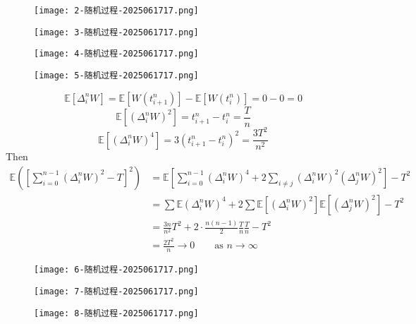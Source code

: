 \begin{figure}[H]
\centering
\texttt{[image: 2-随机过程-2025061717.png]}
\label{}
\end{figure}

\begin{figure}[H]
\centering
\texttt{[image: 3-随机过程-2025061717.png]}
\label{}
\end{figure}
\begin{figure}[H]
\centering
\texttt{[image: 4-随机过程-2025061717.png]}
\label{}
\end{figure}

\begin{figure}[H]
\centering
\texttt{[image: 5-随机过程-2025061717.png]}
\label{}
\end{figure}
\[
\mathbb{E}[\Delta_{i}^{n}W]=\mathbb{E}[W(t_{i+1}^{n})]-\mathbb{E}[W(t_i^{n})]=0-0=0
\]
\[
\mathbb{E}[(\Delta _i^{n}W)^{2}]=t_{i+1}^{n}-t_i^{n}=\frac{T}{n}
\]
\[
\mathbb{E}[(\Delta _i^{n}W)^{4}]=3(t_{i+1}^{n}-t_i^{n})^{2}=\frac{3T^{2}}{n^{2}}
\]
Then
\[
\begin{aligned}
\mathbb{E}\left( \left[ \sum_{i=0}^{n-1} (\Delta _i^{n}W)^{2}-T \right]^{2} \right) & =\mathbb{E}\left[ \sum_{i=0}^{n-1} (\Delta _i^{n}W)^{4}+2\sum_{i\neq j}(\Delta _i^{n}W)^{2}(\Delta _j^{n}W)^{2} \right]-T^{2} \\
 & =\sum \mathbb{E}(\Delta _i^{n}W)^{4}+2\sum \mathbb{E}[(\Delta _i^{n}W)^{2} ]\mathbb{E}[(\Delta _j^{n}W)^{2}]-T^{2} \\
 & =\frac{3n}{n^{2}}T^{2}+2\cdot\frac{n(n-1)}{2}\frac{T}{n}\frac{T}{n}-T^{2}  \\
 & =\frac{2T^{2}}{n}\to0\qquad \text{as }n\to \infty
\end{aligned}
\]
\begin{figure}[H]
\centering
\texttt{[image: 6-随机过程-2025061717.png]}
\label{}
\end{figure}

\begin{figure}[H]
\centering
\texttt{[image: 7-随机过程-2025061717.png]}
\label{}
\end{figure}

\begin{figure}[H]
\centering
\texttt{[image: 8-随机过程-2025061717.png]}
\label{}
\end{figure}

